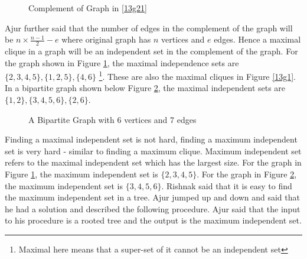 \begin{figure}
\begin{center}
\caption{ Complement of Graph in \ref{13g21}}\label{13g2}
\end{center}
\end{figure}

Ajur further said that the number of edges in the complement of the graph will be $n\times\frac{n-1}{2}-e$ where original graph has $n$ 
vertices and $e$ edges. Hence a maximal clique in a graph will be an independent set in the 
complement of the graph. For the graph shown in Figure \ref{13g2}, the maximal independence sets are $\{2,3,4,5\}, \{1,2,5\}, \{4,6\}$ \footnote{Maximal here means that a super-set of it cannot be an independent set}. 
These are also the maximal cliques in Figure \ref{13g1}. In a bipartite graph shown below Figure \ref{13g3}, the maximal independent sets are $\{1,2\}, \{3,4,5,6\}, \{2,6\}$.

\begin{figure}
\begin{center}
\caption{ A Bipartite Graph with 6 vertices and 7 edges}\label{13g3}
\end{center}
\end{figure}

Finding a maximal independent set is not hard, finding a maximum independent set is very hard - similar to finding a maximum clique. Maximum independent set refers to the maximal independent set which has the largest size. For the graph in Figure \ref{13g2}, the maximum independent set is $\{2,3,4,5\}$. For the graph in Figure \ref{13g3}, the maximum independent set is $\{3,4,5,6\}$.  Rishnak said that it is easy to find the maximum independent set in a tree. Ajur jumped up and down and said that he had a solution and described the following procedure. Ajur said that the input to his procedure is a rooted tree and the output is the maximum independent set.

